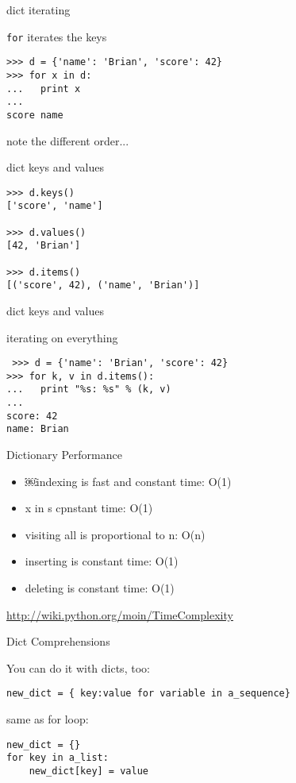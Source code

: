 \documentclass{beamer}
\begin{document}
\begin{frame}[fragile]{dict iterating}

{\Large \verb|for| iterates the keys}
\vfill
\begin{verbatim}
>>> d = {'name': 'Brian', 'score': 42}
>>> for x in d:
...   print x
...
score name
\end{verbatim}
\vfill
{note the different order...}
\end{frame}

\begin{frame}[fragile]{dict keys and values}

\vfill
\begin{verbatim}
>>> d.keys()
['score', 'name']

>>> d.values()
[42, 'Brian']

>>> d.items()
[('score', 42), ('name', 'Brian')]
\end{verbatim}
\vfill
\end{frame}

\begin{frame}[fragile]{dict keys and values}

{\Large iterating on everything}
\vfill
\begin{verbatim}
￼>>> d = {'name': 'Brian', 'score': 42}
>>> for k, v in d.items():
...   print "%s: %s" % (k, v)
...
score: 42
name: Brian
\end{verbatim}
\vfill
\end{frame}

\begin{frame}[fragile]{Dictionary Performance }

\begin{itemize}
  \item￼indexing is fast and constant time: O(1)
  \item x in s cpnstant time: O(1)
  \item visiting all is proportional to n: O(n)
  \item inserting is constant time: O(1)
  \item deleting is constant time: O(1)
\end{itemize}

\vfill
\url{ http://wiki.python.org/moin/TimeComplexity}

\end{frame} 

\begin{frame}[fragile]{Dict Comprehensions}

{\Large You can do it with dicts, too:}

\begin{verbatim}
new_dict = { key:value for variable in a_sequence}
\end{verbatim}

{\Large same as for loop:}

\begin{verbatim}
new_dict = {}
for key in a_list:
    new_dict[key] = value
\end{verbatim}

\end{frame} 
\end{document}
